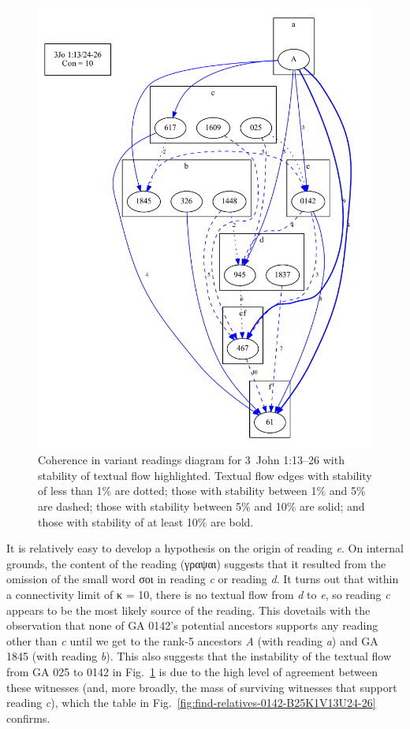 \documentclass[a4paper, 12pt]{article}
\begin{document}
	\newpage
	
	\begin{figure}[h!]
		\centering
		\includegraphics[scale=0.65]{../graphics/B25K1V13U24-26-coherence-variants-strengths.pdf}
		\caption{Coherence in variant readings diagram for 3~John 1:13–26 with stability of textual flow highlighted. Textual flow edges with stability of less than 1\% are dotted; those with stability between 1\% and 5\% are dashed; those with stability between 5\% and 10\% are solid; and those with stability of at least 10\% are bold.}
		\label{fig:coherence-variants-strengths}
	\end{figure}
	
	\newpage
	
	It is relatively easy to develop a hypothesis on the origin of reading \emph{e}. On internal grounds, the content of the reading (γραψαι) suggests that it resulted from the omission of the small word σοι in reading \emph{c} or reading \emph{d}. It turns out that within a connectivity limit of κ = 10, there is no textual flow from \emph{d} to \emph{e}, so reading \emph{c} appears to be the most likely source of the reading. This dovetails with the observation that none of GA 0142's potential ancestors supports any reading other than \emph{c} until we get to the rank-5 ancestors \emph{A} (with reading \emph{a}) and GA 1845 (with reading \emph{b}). This also suggests that the instability of the textual flow from GA 025 to 0142 in Fig.~\ref{fig:coherence-variants-strengths} is due to the high level of agreement between these witnesses (and, more broadly, the mass of surviving witnesses that support reading \emph{c}), which the table in Fig.~\ref{fig:find-relatives-0142-B25K1V13U24-26} confirms.
	
\end{document}
